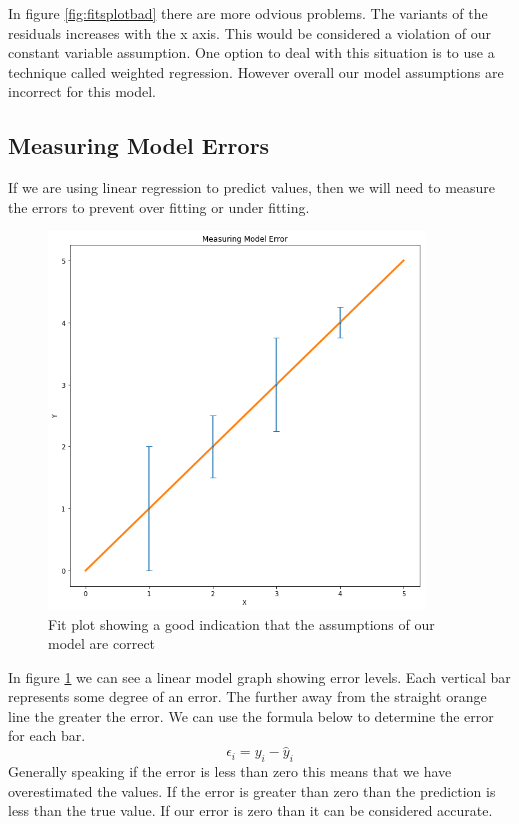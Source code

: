 In figure \ref{fig:fitsplotbad} there are more odvious problems. The variants of the residuals increases with the x axis. This would be considered a violation of our constant variable assumption. One option to deal with this situation is to use a technique called weighted regression. However overall our model assumptions are incorrect for this model.

\subsection*{Measuring Model Errors}

If we are using linear regression to predict values, then we will need to measure the errors to prevent over fitting or under fitting.
\begin{figure}[H]
  \centering
  \includegraphics[scale=0.5,width=100mm]{./images/graph-error-bars.png}
  \caption{Fit plot showing a good indication that the assumptions of our model are correct}
  \label{fig:graph-error-bars}
\end{figure}
In figure \ref{fig:graph-error-bars} we can see a linear model graph showing error levels. Each vertical bar represents some degree of an error. The further away from the straight orange line the greater the error. We can use the formula below to determine the error for each bar.
\begin{equation}
    \epsilon_i = y_i - \hat y_i
\end{equation}
Generally speaking if the error is less than zero this means that we have overestimated the values. If the error is greater than zero than the prediction is less than the true value. If our error is zero than it can be considered accurate.

